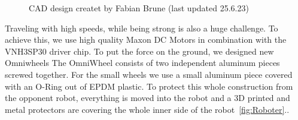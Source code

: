 \documentclass{scrartcl}
\begin{document}
\begin{figure}[!h]
    \begin{center}
    \caption{CAD design createt by Fabian Brune (last updated 25.6.23)}
    \label{Robot}
    \end{center}
    \end{figure}

Traveling with high speeds, while being strong is also a huge challenge. To achieve this, we use high quality
Maxon DC Motors in combination with the VNH3SP30 driver chip. To put the force on the ground, we designed
new Omniwheels
The OmniWheel consists of two independent aluminum pieces screwed together. For the small wheels we use a small
aluminum piece covered with an O-Ring out of EPDM plastic.
\newline
To protect this whole construction from the opponent robot, everything is moved into the robot and a 3D
printed and metal protectors are covering the whole inner side of the robot~\ref{fig:Roboter}..
\newpage
\end{document}
